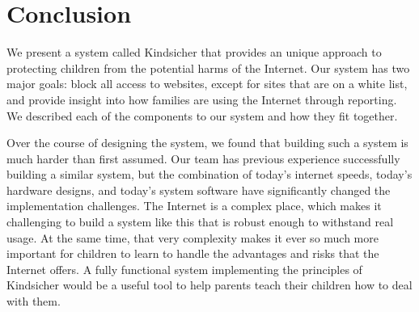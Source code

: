 
\section{Conclusion}

We present a system called Kindsicher that provides an unique approach to
protecting children from the potential harms of the Internet. Our system has
two major goals: block all access to websites, except for sites that are on a
white list, and provide insight into how families are using the Internet through
reporting. We described each of the components to our system and how they fit
together.

Over the course of designing the system, we found that building such a system
is much harder than first assumed.  
%
Our team has previous experience successfully building a similar system, but
the combination of today's internet speeds, today's hardware designs,
and today's system software have significantly changed the implementation
challenges.
%
The Internet is a complex place, which makes it challenging to build a
system like this that is robust enough to withstand real usage.
%
At the same time, that very complexity makes it ever so much more
important for children to learn to handle the advantages and risks that
the Internet offers.  A fully functional system implementing the principles of
Kindsicher would be a useful tool to help parents teach their children how to
deal with them.


